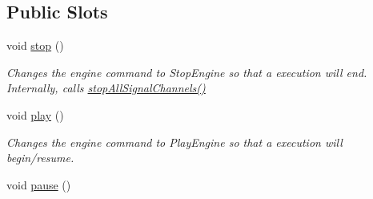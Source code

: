 \subsection*{Public Slots}
\begin{DoxyCompactItemize}
\item 
\hypertarget{class_picto_1_1_engine_1_1_picto_engine_a97e8a787fbfe220e7449c7fb919984e5}{void \hyperlink{class_picto_1_1_engine_1_1_picto_engine_a97e8a787fbfe220e7449c7fb919984e5}{stop} ()}\label{class_picto_1_1_engine_1_1_picto_engine_a97e8a787fbfe220e7449c7fb919984e5}

\begin{DoxyCompactList}\small\item\em Changes the engine command to Stop\-Engine so that a execution will end.  Internally, calls \hyperlink{class_picto_1_1_engine_1_1_picto_engine_a801e4a9fbb82f80b13ead4c10967a962}{stop\-All\-Signal\-Channels()} \end{DoxyCompactList}\item 
\hypertarget{class_picto_1_1_engine_1_1_picto_engine_acdff95264d9356983d09c9b80b0c8d2e}{void \hyperlink{class_picto_1_1_engine_1_1_picto_engine_acdff95264d9356983d09c9b80b0c8d2e}{play} ()}\label{class_picto_1_1_engine_1_1_picto_engine_acdff95264d9356983d09c9b80b0c8d2e}

\begin{DoxyCompactList}\small\item\em Changes the engine command to Play\-Engine so that a execution will begin/resume. \end{DoxyCompactList}\item 
\hypertarget{class_picto_1_1_engine_1_1_picto_engine_a1a8c8314c6b31b6b5cad1dff6cf32802}{void \hyperlink{class_picto_1_1_engine_1_1_picto_engine_a1a8c8314c6b31b6b5cad1dff6cf32802}{pause} ()}\label{class_picto_1_1_engine_1_1_picto_engine_a1a8c8314c6b31b6b5cad1dff6cf32802}


\end{DoxyCompactItemize}
